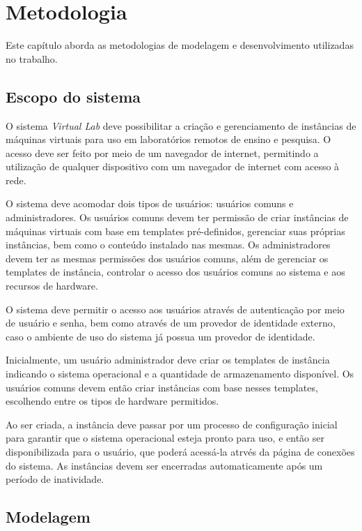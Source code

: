 
\chapter{Metodologia}
\label{cap:metodologia}

Este capítulo aborda as metodologias de modelagem e desenvolvimento utilizadas no trabalho.

\section{Escopo do sistema}
\label{sec:escopoDoSistema}

O sistema \textit{Virtual Lab} deve possibilitar a criação e gerenciamento de instâncias de máquinas virtuais para uso em laboratórios remotos de ensino e pesquisa.
O acesso deve ser feito por meio de um navegador de internet, permitindo a utilização de qualquer dispositivo com um navegador de internet com acesso à rede.

O sistema deve acomodar dois tipos de usuários: usuários comuns e administradores.
Os usuários comuns devem ter permissão de criar instâncias de máquinas virtuais com base em templates pré-definidos, gerenciar suas próprias instâncias, bem como o conteúdo instalado nas mesmas.
Os administradores devem ter as mesmas permissões dos usuários comuns, além de gerenciar os templates de instância, controlar o acesso dos usuários comuns ao sistema e aos recursos de hardware.

O sistema deve permitir o acesso aos usuários através de autenticação por meio de usuário e senha, bem como através de um provedor de identidade externo, caso o ambiente de uso do sistema já possua um provedor de identidade.

Inicialmente, um usuário administrador deve criar os templates de instância indicando o sistema operacional e a quantidade de armazenamento disponível.
Os usuários comuns devem então criar instâncias com base nesses templates, escolhendo entre os tipos de hardware permitidos.

Ao ser criada, a instância deve passar por um processo de configuração inicial para garantir que o sistema operacional esteja pronto para uso, e então ser disponibilizada para o usuário, que poderá acessá-la atrvés da página de conexões do sistema. As instâncias devem ser encerradas automaticamente após um período de inatividade.

\section{Modelagem}
\label{sec:modelagemDoSistema}

